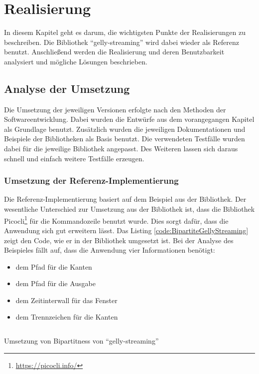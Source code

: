 \chapter{Realisierung}
In diesem Kapitel geht es darum, die wichtigsten Punkte der Realisierungen
zu beschreiben. Die Bibliothek \enquote{gelly-streaming} wird dabei wieder als
Referenz benutzt. Anschließend werden die Realisierung und deren Benutzbarkeit
analysiert und mögliche Lösungen beschrieben.

\section{Analyse der Umsetzung}
Die Umsetzung der jeweiligen Versionen erfolgte nach den Methoden der
Softwareentwicklung. Dabei wurden die Entwürfe aus dem vorangegangen Kapitel
als Grundlage benutzt. Zusätzlich wurden die jeweiligen Dokumentationen und
Beispiele der Bibliotheken als Basis benutzt. Die verwendeten Testfälle wurden
dabei für die jeweilige Bibliothek angepasst. Des Weiteren lassen sich daraus
schnell und einfach weitere Testfälle erzeugen.

\subsection{Umsetzung der Referenz-Implementierung}
Die Referenz-Implementierung basiert auf dem Beispiel aus der Bibliothek. Der
wesentliche Unterschied zur Umsetzung aus der Bibliothek ist, dass die
Bibliothek Picocli\footnote{\url{https://picocli.info/}} für die Kommandozeile
benutzt wurde. Dies sorgt dafür, dass die Anwendung sich gut erweitern lässt.
Das Listing \ref{code:BipartiteGellyStreaming} zeigt den Code, wie er in der
Bibliothek umgesetzt ist. Bei der Analyse des Beispieles fällt auf, dass die
Anwendung vier Informationen benötigt:

\begin{itemize}
\item dem Pfad für die Kanten
\item dem Pfad für die Ausgabe
\item dem Zeitinterwall für das Fenster
\item dem Trennzeichen für die Kanten
\end{itemize} 

\begin{listing}
\inputminted[breaklines=true]{java}{../material/code/BipartitenessCheckExample.java}
\caption{Umsetzung von Bipartitness von \enquote{gelly-streaming} \cite{Kalavri2018}}
\label{code:BipartiteGellyStreaming}
\end{listing}

